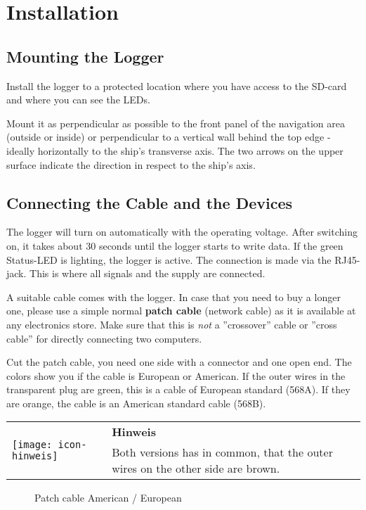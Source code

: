 \documentclass[pdftex, 8pt, paper=130mm:92mm,pagesize]{scrartcl}
\let\stdsection\section
\renewcommand\section{\newpage\stdsection}
\newlength{\iconwidth}
\newenvironment{displaybox}[2]{%
  \begin{center}
    \setlength\arrayrulewidth{0.75pt}%
    \arrayrulecolor{white}%
    \renewcommand{\arraystretch}{1.3}%
    \begin{tabular}{p{\iconwidth}p{\linewidth-4\tabcolsep-\iconwidth}}
      \multirow{2}{*}{#2}&\cellcolor{boxheadcol}\textbf{\color{white}#1} \\%
      \hhline{~-}%
      &\cellcolor{boxcol}%
}{%
      \\
    \end{tabular}
  \end{center}%
\arrayrulecolor{black}
}
\newenvironment{Hinweis}{%
\begin{displaybox}{Hinweis}{\texttt{[image: icon-hinweis]}}}%
{\end{displaybox}}
\begin{document}
\section{Installation}

\subsection{Mounting the Logger}

Install the logger to a protected location where you have access to the SD-card and where you can see the LEDs. 

Mount it as perpendicular as possible to the front panel of the navigation area (outside or inside) or perpendicular to a vertical wall behind the top edge - ideally horizontally to the ship's transverse axis. The two arrows on the upper surface indicate the direction in respect to the ship's axis. 

\subsection{Connecting the Cable and the Devices}

The logger will turn on automatically with the operating voltage. After switching on, it takes about 30 seconds until the logger starts to write data. If the green Status-LED is lighting, the logger is active. The connection is made via the RJ45-jack. This is where all signals and the supply are connected. 

A suitable cable comes with the logger. In case that you need to buy a longer one, please use a simple normal \textbf{patch cable} (network cable) as it is available at any electronics store. Make sure that this is \textit{not} a ''crossover'' cable or ''cross cable'' for directly connecting two computers. 

Cut the patch cable, you need one side with a connector and one open end. The colors show you if the cable is European or American. If the outer wires in the transparent plug are green, this is a cable of European standard (568A). If they are orange, the cable is an American standard cable (568B).

\begin{Hinweis}
Both versions has in common, that the outer wires on the other side are brown.
\end{Hinweis}

\begin{figure}
\caption{Patch cable American / European}
\end{figure}
\end{document}
